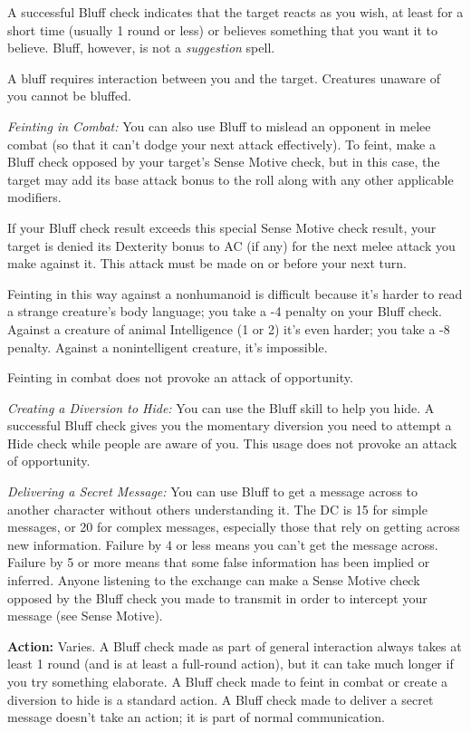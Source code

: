 \documentclass{article}
\begin{document}
A successful Bluff check indicates that the target reacts as you wish, at least 
for a short time (usually 1 round or less) or believes something that you want 
it to believe. Bluff, however, is not a \textit{suggestion }spell. 

A bluff requires interaction between you and the target. Creatures unaware of you 
cannot be bluffed.

\textit{Feinting in Combat: }You can also use Bluff to mislead an opponent in melee 
combat (so that it can't dodge your next attack effectively). To feint, make a 
Bluff check opposed by your target's Sense Motive check, but in this case, the 
target may add its base attack bonus to the roll along with any other applicable 
modifiers.

If your Bluff check result exceeds this special Sense Motive check result, your 
target is denied its Dexterity bonus to AC (if any) for the next melee attack you 
make against it. This attack must be made on or before your next turn.

Feinting in this way against a nonhumanoid is difficult because it's harder to 
read a strange creature's body language; you take a -4 penalty on your Bluff check. 
Against a creature of animal Intelligence (1 or 2) it's even harder; you take a 
-8 penalty. Against a nonintelligent creature, it's impossible.

Feinting in combat does not provoke an attack of opportunity.

\textit{Creating a Diversion to Hide: }You can use the Bluff skill to help you 
hide. A successful Bluff check gives you the momentary diversion you need to attempt 
a Hide check while people are aware of you. This usage does not provoke an attack 
of opportunity.

\textit{Delivering a Secret Message: }You can use Bluff to get a message across 
to another character without others understanding it. The DC is 15 for simple messages, 
or 20 for complex messages, especially those that rely on getting across new information. 
Failure by 4 or less means you can't get the message across. Failure by 5 or more 
means that some false information has been implied or inferred. Anyone listening 
to the exchange can make a Sense Motive check opposed by the Bluff check you made 
to transmit in order to intercept your message (see Sense Motive).

\textbf{Action:} Varies. A Bluff check made as part of general interaction always 
takes at least 1 round (and is at least a full-round action), but it can take much 
longer if you try something elaborate. A Bluff check made to feint in combat or 
create a diversion to hide is a standard action. A Bluff check made to deliver 
a secret message doesn't take an action; it is part of normal communication.
\end{document}
